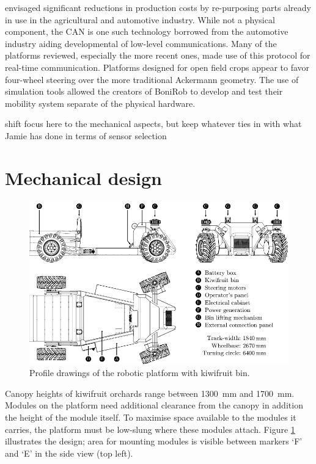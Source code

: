 \documentclass[preprint,authoryear,12pt]{elsarticle}
\begin{document}
    \cite{Blackmore2007} envisaged significant reductions in production costs by re-purposing parts already in use in the agricultural and automotive industry.
    While not a physical component, the CAN is one such technology borrowed from the automotive industry aiding developmental of low-level communications.
    Many of the platforms reviewed, especially the more recent ones, made use of this protocol for real-time communication.
    Platforms designed for open field crops appear to favor four-wheel steering over the more traditional Ackermann geometry.
    The use of simulation tools allowed the creators of BoniRob to develop and test their mobility system separate of the physical hardware.

    \color{red}
        shift focus here to the mechanical aspects, but keep whatever ties in with what Jamie has done in terms of sensor selection
    \color{black}

\section{Mechanical design}
\label{sect:mechanical}

    \begin{figure}[htb]
        \centering
        \includegraphics[width=\linewidth]{imgs/profile_views/AMMP-All-Labelled.pdf}
        \caption{Profile drawings of the robotic platform with kiwifruit bin.}
        \label{fig:AMMP}
    \end{figure}

    Canopy heights of kiwifruit orchards range between \SI{1300}{\milli\meter} and \SI{1700}{\milli\meter}.
    Modules on the platform need additional clearance from the canopy in addition the height of the module itself.
    To maximise space available to the modules it carries, the platform must be low-slung where these modules attach.
    Figure \ref{fig:AMMP} illustrates the design; area for mounting modules is visible between markers `F' and `E' in the side view (top left).
\end{document}
